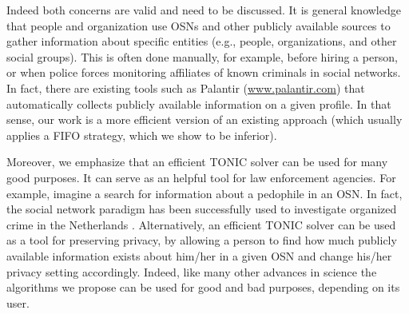 \documentclass[journal]{IEEEtran}
\begin{document}
Indeed both concerns are valid and need to be discussed. It is general knowledge that people and organization use OSNs and other publicly available sources to gather information about specific entities (e.g., people, organizations, and other social groups). This is often done manually, for example, before hiring a person, 
or when police forces monitoring affiliates of known criminals in social networks. 
In fact, there are existing tools such as Palantir (\url{www.palantir.com}) that automatically collects publicly available information on a given profile. In that sense, our work is a more efficient version of an existing approach (which usually applies a FIFO strategy, which we show to be inferior). 


Moreover, we emphasize that an efficient TONIC solver can be used for many good purposes. It can serve as an helpful tool for law enforcement agencies. For example, imagine a search for information about a pedophile in an OSN. In fact, the social network paradigm has been successfully used to investigate organized crime in the Netherlands \cite{klerks2001network}. Alternatively, an efficient TONIC solver can be used as a tool for preserving privacy, by allowing a person to find how much publicly available information exists about him/her in a given OSN and change his/her privacy setting accordingly. 
Indeed, like many other advances in science the algorithms we propose can be used for good and bad purposes, depending on its user. 








\ifCLASSOPTIONcaptionsoff
  \newpage
\fi
\end{document}
